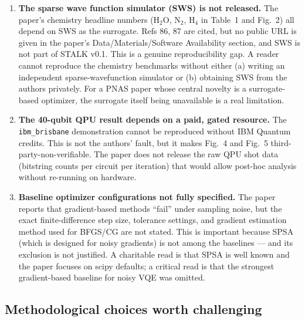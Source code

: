 \documentclass[11pt]{article}
\begin{document}
\begin{enumerate}
  \item \textbf{The sparse wave function simulator (SWS) is not released.} The paper's
        chemistry headline numbers (H$_2$O, N$_2$, H$_4$ in Table~1 and Fig.~2) all
        depend on SWS as the surrogate. Refs 86, 87 are cited, but no public URL is
        given in the paper's Data/Materials/Software Availability section, and SWS is
        not part of STALK v0.1. This is a genuine reproducibility gap. A reader cannot
        reproduce the chemistry benchmarks without either (a) writing an independent
        sparse-wavefunction simulator or (b) obtaining SWS from the authors privately.
        For a PNAS paper whose central novelty is a surrogate-based optimizer, the
        surrogate itself being unavailable is a real limitation.
  \item \textbf{The 40-qubit QPU result depends on a paid, gated resource.} The
        \texttt{ibm\_brisbane} demonstration cannot be reproduced without IBM Quantum
        credits. This is not the authors' fault, but it makes Fig.~4 and Fig.~5
        third-party-non-verifiable. The paper does not release the raw QPU shot data
        (bitstring counts per circuit per iteration) that would allow post-hoc
        analysis without re-running on hardware.
  \item \textbf{Baseline optimizer configurations not fully specified.} The paper
        reports that gradient-based methods ``fail'' under sampling noise, but the
        exact finite-difference step size, tolerance settings, and gradient estimation
        method used for BFGS/CG are not stated. This is important because SPSA (which
        is designed for noisy gradients) is not among the baselines --- and its
        exclusion is not justified. A charitable read is that SPSA is well known and
        the paper focuses on scipy defaults; a critical read is that the strongest
        gradient-based baseline for noisy VQE was omitted.
\end{enumerate}

\subsection{Methodological choices worth challenging}
\end{document}
